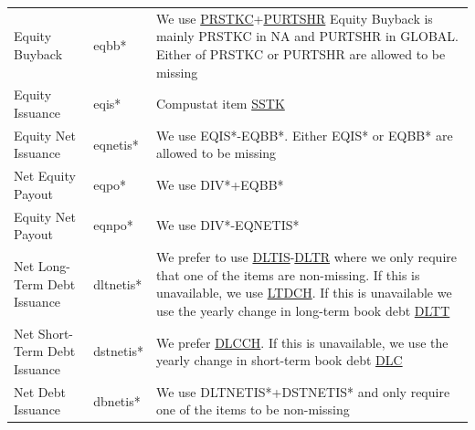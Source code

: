 \documentclass[12pt,title,fleqn]{article}
\begin{document}
{\begin{longtable}{@{\extracolsep{\fill}}|m{5cm}|l|m{8cm}|@{}}
	Equity Buyback & eqbb\mbox{*} & We use \href{https://wrds-www.wharton.upenn.edu/data-dictionary/form_metadata/comp_na_daily_all_funda_cashflowitems/PRSTKC/}{PRSTKC}+\href{https://wrds-www.wharton.upenn.edu/data-dictionary/form_metadata/comp_global_daily_gfunda_dataitemsmz/PURTSHR/}{PURTSHR} Equity Buyback is mainly PRSTKC in NA and PURTSHR in GLOBAL. Either of PRSTKC or PURTSHR are allowed to be missing\\
	
	Equity Issuance & eqis\mbox{*} & Compustat item \href{https://wrds-www.wharton.upenn.edu/data-dictionary/form_metadata/comp_na_daily_all_funda_cashflowitems/SSTK/}{SSTK}\\
	
	Equity Net Issuance & eqnetis\mbox{*} & We use EQIS\mbox{*}-EQBB\mbox{*}. Either EQIS\mbox{*} or EQBB\mbox{*} are allowed to be missing \\
	
	Net Equity Payout & eqpo\mbox{*} & We use DIV\mbox{*}+EQBB\mbox{*} \\
	
	Equity Net Payout & eqnpo\mbox{*} & We use DIV\mbox{*}-EQNETIS\mbox{*} \\
	
	Net Long-Term Debt Issuance & dltnetis\mbox{*} & We prefer to use \href{https://wrds-www.wharton.upenn.edu/data-dictionary/form_metadata/comp_na_daily_all_funda_cashflowitems/DLTIS/}{DLTIS}-\href{https://wrds-www.wharton.upenn.edu/data-dictionary/form_metadata/comp_na_daily_all_funda_cashflowitems/DLTR/}{DLTR} where we only require that one of the items are non-missing. If this is unavailable, we use \href{https://wrds-www.wharton.upenn.edu/data-dictionary/form_metadata/comp_global_daily_gfunda_dataitemsal/LTDCH/}{LTDCH}. If this is unavailable we use the yearly change in long-term book debt \href{https://wrds-www.wharton.upenn.edu/data-dictionary/form_metadata/comp_na_daily_all_funda_balancesheetitems/DLTT/}{DLTT} \\
	
	Net Short-Term Debt Issuance & dstnetis\mbox{*} & We prefer \href{https://wrds-www.wharton.upenn.edu/data-dictionary/form_metadata/comp_na_daily_all_funda_cashflowitems/DLCCH/}{DLCCH}. If this is unavailable, we use the yearly change in short-term book debt \href{https://wrds-www.wharton.upenn.edu/data-dictionary/form_metadata/comp_na_daily_all_funda_balancesheetitems/DLC/}{DLC}\\
	
	Net Debt Issuance & dbnetis\mbox{*} & We use DLTNETIS\mbox{*}+DSTNETIS\mbox{*} and only require one of the items to be non-missing \\
	

\end{longtable}}
\end{document}
